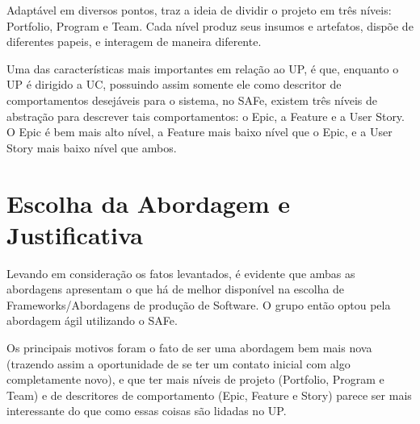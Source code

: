 Adaptável em diversos pontos, traz a ideia de dividir o projeto em três níveis: Portfolio, Program e Team. Cada nível produz seus insumos e artefatos, dispõe de diferentes papeis, e interagem de maneira diferente.

Uma das características mais importantes em relação ao UP, é que, enquanto o UP é dirigido a UC, possuindo assim somente ele como descritor de comportamentos desejáveis para o sistema, no SAFe, existem três níveis de abstração para descrever tais comportamentos: o Epic, a Feature e a User Story. O Epic é bem mais alto nível, a Feature mais baixo nível que o Epic, e a User Story mais baixo nível que ambos.

\section{Escolha da Abordagem e Justificativa}
Levando em consideração os fatos levantados, é evidente que ambas as abordagens apresentam o que há de melhor disponível na escolha de Frameworks/Abordagens de produção de Software. O grupo então optou pela abordagem ágil utilizando o SAFe.

Os principais motivos foram o fato de ser uma abordagem bem mais nova (trazendo assim a oportunidade de se ter um contato inicial com algo completamente novo), e que ter mais níveis de projeto (Portfolio, Program e Team) e de descritores de comportamento (Epic, Feature e Story) parece ser mais interessante do que como essas coisas são lidadas no UP.
